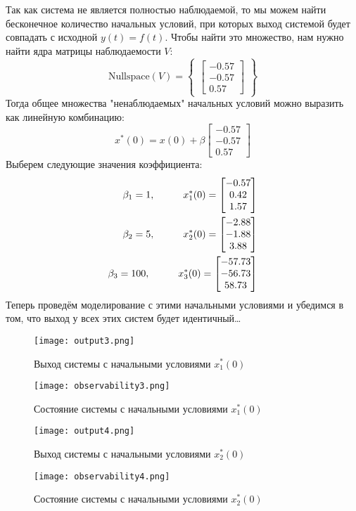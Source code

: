 Так как система не является полностью наблюдаемой, то мы можем найти бесконечное количество начальных условий,
при которых выход системой будет совпадать с исходной $y(t) = f(t)$. Чтобы найти это множество, нам нужно найти  ядра матрицы наблюдаемости $V$:
$$
\text{Nullspace}(V) = \begin{Bmatrix}
    \begin{bmatrix}
        -0.57\\-0.57\\0.57
    \end{bmatrix}
\end{Bmatrix} 
$$
Тогда общее множества "ненаблюдаемых" начальных условий можно выразить как линейную комбинацию:
$$
    x^*(0) = x(0) + \beta \begin{bmatrix}
                            -0.57\\-0.57\\0.57
                            \end{bmatrix}
$$
Выберем следующие значения коэффициента:
$$
    \begin{aligned}
        \beta_1=1, \hspace*{1cm} x^*_1(0) = \begin{bmatrix}
            -0.57\\0.42\\1.57
        \end{bmatrix} \\
        \beta_2=5, \hspace*{1cm} x^*_2(0) = \begin{bmatrix}
            -2.88\\-1.88\\3.88
        \end{bmatrix} \\
        \beta_3=100, \hspace*{1cm} x^*_3(0) = \begin{bmatrix}
            -57.73\\-56.73\\58.73
        \end{bmatrix}
    \end{aligned}
$$
Теперь проведём моделирование с этими начальными условиями и убедимся в том, что выход у всех этих систем будет идентичный\dots
\newpage
\begin{figure}[ht]
\centering
\texttt{[image: output3.png]}
\caption{Выход системы с начальными условиями $x^*_1(0)$}
\end{figure}
\begin{figure}[ht]
\centering
\texttt{[image: observability3.png]}
\caption{Состояние системы с начальными условиями $x^*_1(0)$}
\end{figure}
\newpage
\begin{figure}[ht]
\centering
\texttt{[image: output4.png]}
\caption{Выход системы с начальными условиями $x^*_2(0)$}
\end{figure}
\begin{figure}[ht]
\centering
\texttt{[image: observability4.png]}
\caption{Состояние системы с начальными условиями $x^*_2(0)$}
\end{figure}

